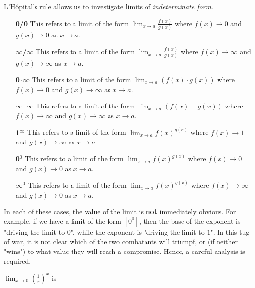 \documentclass{ximera}
\begin{document}
L'H\^{o}pital's rule allows us to investigate limits of
\textit{indeterminate form}.

\begin{definition}\hfil
\begin{itemize}
\item[\textbf{0/0}] This refers to a limit of the form $\lim_{x\to a}
  \frac{f(x)}{g(x)}$ where $f(x)\to 0$ and $g(x)\to 0$ as $x\to a$.
\item[\textbf{$\pmb\infty$/$\pmb\infty$}] This refers to a limit of the form $\lim_{x\to a}
  \frac{f(x)}{g(x)}$ where $f(x)\to \infty$ and $g(x)\to \infty$ as $x\to a$.
\item[\textbf{0\,$\pmb{\cdot\infty}$}] This refers to a limit of the form $\lim_{x\to a}
  \left(f(x)\cdot g(x)\right)$ where $f(x)\to 0$ and $g(x)\to \infty$ as $x\to a$.
\item[\textbf{$\pmb\infty$--$\pmb\infty$}] This refers to a limit of the form $\lim_{x\to a}\left(
  f(x)-g(x)\right)$ where $f(x)\to \infty$ and $g(x)\to \infty$ as $x\to a$.

\item[\textbf{1$^{\pmb\infty}$}] This refers to a limit of the form $\lim_{x\to a}
  f(x)^{g(x)}$ where $f(x)\to 1$ and $g(x)\to \infty$ as $x\to a$.
\item[\textbf{0$^\text{0}$}] This refers to a limit of the form $\lim_{x\to a}
  f(x)^{g(x)}$ where $f(x)\to 0$ and $g(x)\to 0$ as $x\to a$.
\item[\textbf{$\pmb\infty^\text{0}$}] This refers to a limit of the form $\lim_{x\to a}
  f(x)^{g(x)}$ where $f(x)\to \infty$ and $g(x)\to 0$ as $x\to a$.
\end{itemize}
 
\end{definition}

In each of these cases, the value of the limit is \textbf{not} immediately
obvious.  For example, if we have a limit of the form $[0^0]$, then the base of the exponent is 
"driving the limit to $0$", while the exponent is "driving the limit to $1$".  
In this tug of war, it is not clear which of the two combatants will triumpf, 
or (if neither "wins") to what value they will reach a compromise. Hence, a careful analysis is required.


\begin{question}
    $\lim_{x \to 0} \left(\frac{1}{x}\right)^x$ is
    \begin{multiple-choice}[dropdown]
    	\choice[correct]{a $[\infty^0}]$ indeterminate form}
    	\choice{a $[0^0]$ indeterminate form}
    	\choice{a $\frac{0}{0}$ indeterminate form}
    	\choice{not an indeterminate form}
    \end{multiple-choice}
\end{question}
\end{document}
